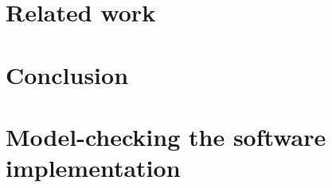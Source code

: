 \documentclass{phd-thesis}
\begin{document}
\chapter{Related work}\label{cha:related}


\chapter{Conclusion}


\appendix
\chapter[Model-checking the implementation]{Model-checking the software implementation}\label{sec:full-model}


%


\backmatter

\printindex
\end{document}

